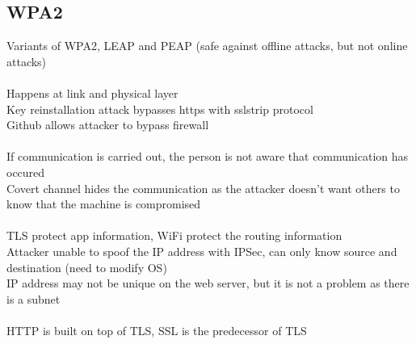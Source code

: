 \documentclass[11pt]{article}
\begin{document}
\begin{multicols*}{3}
\subsection*{WPA2}
Variants of WPA2, LEAP and PEAP (safe against offline attacks, but not online attacks)\\\\
Happens at link and physical layer\\
Key reinstallation attack bypasses https with sslstrip protocol\\
Github allows attacker to bypass firewall\\\\
If communication is carried out, the person is not aware that communication has occured\\
Covert channel hides the communication as the attacker doesn't want others to know that the machine is compromised
\\\\
TLS protect app information, WiFi protect the routing information\\
Attacker unable to spoof the IP address with IPSec, can only know source and destination (need to modify OS)\\
IP address may not be unique on the web server, but it is not a problem as there is a subnet\\\\
HTTP is built on top of TLS, SSL is the predecessor of TLS
\end{multicols*}
\end{document}
